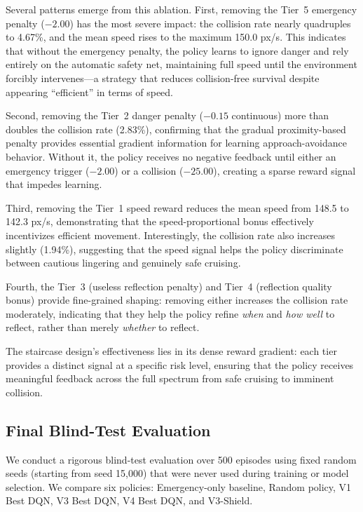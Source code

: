 \documentclass[conference]{IEEEtran}
\begin{document}
Several patterns emerge from this ablation. First, removing the Tier~5 emergency penalty ($-2.00$) has the most severe impact: the collision rate nearly quadruples to 4.67\%, and the mean speed rises to the maximum 150.0 px/s. This indicates that without the emergency penalty, the policy learns to ignore danger and rely entirely on the automatic safety net, maintaining full speed until the environment forcibly intervenes---a strategy that reduces collision-free survival despite appearing ``efficient'' in terms of speed.

Second, removing the Tier~2 danger penalty ($-0.15$ continuous) more than doubles the collision rate (2.83\%), confirming that the gradual proximity-based penalty provides essential gradient information for learning approach-avoidance behavior. Without it, the policy receives no negative feedback until either an emergency trigger ($-2.00$) or a collision ($-25.00$), creating a sparse reward signal that impedes learning.

Third, removing the Tier~1 speed reward reduces the mean speed from 148.5 to 142.3 px/s, demonstrating that the speed-proportional bonus effectively incentivizes efficient movement. Interestingly, the collision rate also increases slightly (1.94\%), suggesting that the speed signal helps the policy discriminate between cautious lingering and genuinely safe cruising.

Fourth, the Tier~3 (useless reflection penalty) and Tier~4 (reflection quality bonus) provide fine-grained shaping: removing either increases the collision rate moderately, indicating that they help the policy refine \emph{when} and \emph{how well} to reflect, rather than merely \emph{whether} to reflect.

The staircase design's effectiveness lies in its dense reward gradient: each tier provides a distinct signal at a specific risk level, ensuring that the policy receives meaningful feedback across the full spectrum from safe cruising to imminent collision.

\subsection{Final Blind-Test Evaluation}

We conduct a rigorous blind-test evaluation over 500 episodes using fixed random seeds (starting from seed 15,000) that were never used during training or model selection. We compare six policies: Emergency-only baseline, Random policy, V1 Best DQN, V3 Best DQN, V4 Best DQN, and V3-Shield.
\end{document}

